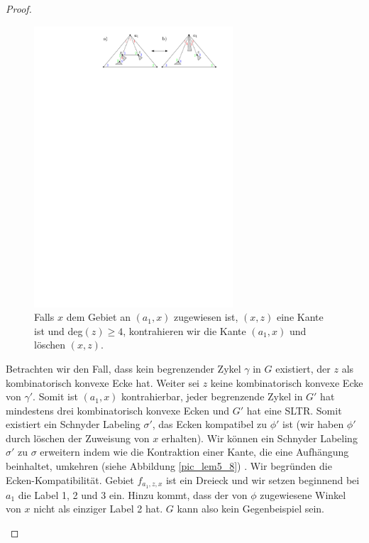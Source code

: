 \begin{proof}
\begin{description}[leftmargin =0pt, font = \bfseries]
\begin{figure}[h]
	\centering
	  \includegraphics[width=0.66\textwidth]{lem5_7.pdf}
    	\caption{Falls $x$ dem Gebiet an $(a_1,x)$ zugewiesen ist, $(x,z)$ eine Kante ist und deg$(z)\geq 4$, kontrahieren wir die Kante $(a_1,x)$ und löschen $(x,z)$.}
    	\label{pic_lem5_7}
\end{figure}

Betrachten wir den Fall, dass kein begrenzender Zykel $\gamma$ in $G$ existiert, der $z$ als kombinatorisch konvexe Ecke hat. Weiter sei $z$ keine kombinatorisch konvexe Ecke von $\gamma'$. Somit ist $(a_1,x)$ kontrahierbar, jeder begrenzende Zykel in $G'$ hat mindestens drei kombinatorisch konvexe Ecken und $G'$ hat eine SLTR. Somit existiert ein Schnyder Labeling $\sigma'$, das Ecken kompatibel zu $\phi'$ ist (wir haben $\phi'$ durch löschen der Zuweisung von $x$ erhalten). Wir können ein Schnyder Labeling $\sigma'$ zu $\sigma$ erweitern indem wie die Kontraktion einer Kante, die eine Aufhängung beinhaltet, umkehren (siehe Abbildung \ref{pic_lem5_8}) \cite[Kapitel 2.6]{felsner12}. Wir begründen die Ecken-Kompatibilität. Gebiet $f_{a_1,z,x}$ ist ein Dreieck und wir setzen beginnend bei $a_1$ die Label 1, 2 und 3 ein. Hinzu kommt, dass der von $\phi$ zugewiesene Winkel von $x$ nicht als einziger Label 2 hat. $G$ kann also kein Gegenbeispiel sein.


\end{description}
\end{proof}
